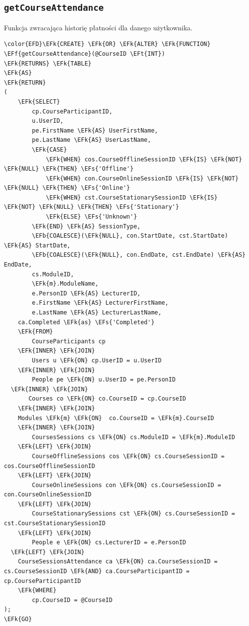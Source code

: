 \documentclass[11pt]{article}
\newcommand{\EFs}[1]{\textcolor{EFs}{#1}} %
\newcommand{\EFk}[1]{\textcolor{EFk}{\textbf{#1}}} %
\newcommand{\EFb}[1]{\textcolor{EFb}{\textbf{#1}}} %
\newcommand{\EFf}[1]{\textcolor{EFf}{#1}} %
\newcommand{\EFt}[1]{\textcolor{EFt}{\textbf{#1}}} %
\begin{document}
\subsection{\texttt{getCourseAttendance}}
\label{sec:org090b036}
Funkcja zwracająca historię płatności dla danego użytkownika.
\begin{Code}
\begin{Verbatim}
\color{EFD}\EFk{CREATE} \EFk{OR} \EFk{ALTER} \EFk{FUNCTION} \EFf{getCourseAttendance}(@CourseID \EFt{INT})
\EFk{RETURNS} \EFk{TABLE}
\EFk{AS}
\EFk{RETURN}
(
    \EFk{SELECT} 
        cp.CourseParticipantID,
        u.UserID,
        pe.FirstName \EFk{AS} UserFirstName,
        pe.LastName \EFk{AS} UserLastName,
        \EFk{CASE} 
            \EFk{WHEN} cos.CourseOfflineSessionID \EFk{IS} \EFk{NOT} \EFk{NULL} \EFk{THEN} \EFs{'Offline'}
            \EFk{WHEN} con.CourseOnlineSessionID \EFk{IS} \EFk{NOT} \EFk{NULL} \EFk{THEN} \EFs{'Online'}
            \EFk{WHEN} cst.CourseStationarySessionID \EFk{IS} \EFk{NOT} \EFk{NULL} \EFk{THEN} \EFs{'Stationary'}
            \EFk{ELSE} \EFs{'Unknown'}
        \EFk{END} \EFk{AS} SessionType,
        \EFb{COALESCE}(\EFk{NULL}, con.StartDate, cst.StartDate) \EFk{AS} StartDate,
        \EFb{COALESCE}(\EFk{NULL}, con.EndDate, cst.EndDate) \EFk{AS} EndDate,
        cs.ModuleID,
        \EFk{m}.ModuleName,
        e.PersonID \EFk{AS} LecturerID,
        e.FirstName \EFk{AS} LecturerFirstName,
        e.LastName \EFk{AS} LecturerLastName,
    ca.Completed \EFk{as} \EFs{'Completed'}
    \EFk{FROM} 
        CourseParticipants cp
    \EFk{INNER} \EFk{JOIN} 
        Users u \EFk{ON} cp.UserID = u.UserID
    \EFk{INNER} \EFk{JOIN} 
        People pe \EFk{ON} u.UserID = pe.PersonID
  \EFk{INNER} \EFk{JOIN}
       Courses co \EFk{ON} co.CourseID = cp.CourseID
    \EFk{INNER} \EFk{JOIN} 
    Modules \EFk{m} \EFk{ON}  co.CourseID = \EFk{m}.CourseID
    \EFk{INNER} \EFk{JOIN} 
        CoursesSessions cs \EFk{ON} cs.ModuleID = \EFk{m}.ModuleID
    \EFk{LEFT} \EFk{JOIN} 
        CourseOfflineSessions cos \EFk{ON} cs.CourseSessionID = cos.CourseOfflineSessionID
    \EFk{LEFT} \EFk{JOIN} 
        CourseOnlineSessions con \EFk{ON} cs.CourseSessionID = con.CourseOnlineSessionID
    \EFk{LEFT} \EFk{JOIN} 
        CourseStationarySessions cst \EFk{ON} cs.CourseSessionID = cst.CourseStationarySessionID
    \EFk{LEFT} \EFk{JOIN} 
        People e \EFk{ON} cs.LecturerID = e.PersonID
  \EFk{LEFT} \EFk{JOIN} 
    CourseSessionsAttendance ca \EFk{ON} ca.CourseSessionID = cs.CourseSessionID \EFk{AND} ca.CourseParticipantID = cp.CourseParticipantID
    \EFk{WHERE} 
        cp.CourseID = @CourseID
);
\EFk{GO}
\end{Verbatim}
\end{Code}
\end{document}
